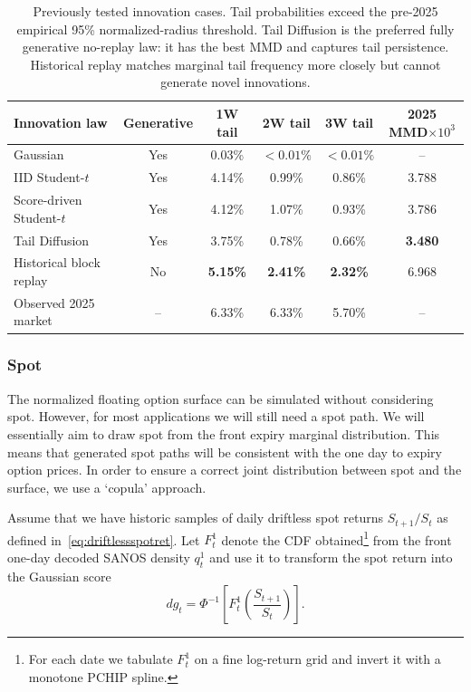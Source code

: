 \documentclass[11pt,a4paper]{article}
\begin{document}
\begin{table}[H]
\centering
\small
\begin{tabular}{lccccc}
\toprule
Innovation law & Generative & 1W tail & 2W tail & 3W tail
  & 2025 MMD\(\times10^3\)\\
\midrule
Gaussian & Yes & 0.03\% & $<0.01\%$ & $<0.01\%$ & --\\
IID Student-\(t\) & Yes & 4.14\% & 0.99\% & 0.86\% & 3.788\\
Score-driven Student-\(t\) & Yes & 4.12\% & 1.07\% & 0.93\% & 3.786\\
Tail Diffusion & Yes & 3.75\% & 0.78\% & 0.66\% & \textbf{3.480}\\
Historical block replay & No & \textbf{5.15\%} & \textbf{2.41\%}
  & \textbf{2.32\%} & 6.968\\
Observed 2025 market & -- & 6.33\% & 6.33\% & 5.70\% & --\\
\bottomrule
\end{tabular}
\caption{Previously tested innovation cases.  Tail probabilities exceed the
pre-2025 empirical 95\% normalized-radius threshold.  Tail Diffusion is the
preferred fully generative no-replay law: it has the best MMD and captures
tail persistence.  Historical replay matches marginal tail frequency more
closely but cannot generate novel innovations.}
\label{tab:innovation-cases}
\end{table}

\subsubsection{Spot}

The normalized floating option surface can be simulated without considering spot.
However, for most  applications we will still need a spot path. We will essentially aim to draw
spot from the front expiry marginal distribution. This means that generated spot paths will be consistent with the one day to expiry option prices.
In order to ensure a correct joint distribution between spot and the surface, we use a `copula' approach.

Assume that we have historic samples of daily driftless spot returns $S_{t+1}/S_t$  as defined in~\eqref{eq:driftlessspotret}.
Let
$F_t^1$ denote the CDF obtained\footnote{For each date we tabulate
$F_t^1$ on a fine log-return grid and invert it with a monotone PCHIP spline.} from the front one-day decoded SANOS density $q_t^1$ and use it
to transform the spot return into the Gaussian score
\begin{equation}
  dg_t =\Phi^{-1}\!\left[
    F_t^1\!\left(\frac{S_{t+1}}{S_t}\right)
  \right].
  \label{eq:front-spot-score}
\end{equation}
\end{document}

